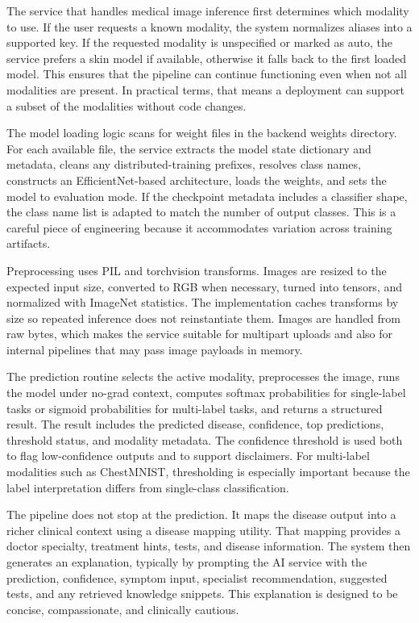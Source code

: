 \documentclass[conference]{IEEEtran}
\begin{document}
The service that handles medical image inference first determines which modality to use. If the user requests a known modality, the system normalizes aliases into a supported key. If the requested modality is unspecified or marked as auto, the service prefers a skin model if available, otherwise it falls back to the first loaded model. This ensures that the pipeline can continue functioning even when not all modalities are present. In practical terms, that means a deployment can support a subset of the modalities without code changes.

The model loading logic scans for weight files in the backend weights directory. For each available file, the service extracts the model state dictionary and metadata, cleans any distributed-training prefixes, resolves class names, constructs an EfficientNet-based architecture, loads the weights, and sets the model to evaluation mode. If the checkpoint metadata includes a classifier shape, the class name list is adapted to match the number of output classes. This is a careful piece of engineering because it accommodates variation across training artifacts.

Preprocessing uses PIL and torchvision transforms. Images are resized to the expected input size, converted to RGB when necessary, turned into tensors, and normalized with ImageNet statistics. The implementation caches transforms by size so repeated inference does not reinstantiate them. Images are handled from raw bytes, which makes the service suitable for multipart uploads and also for internal pipelines that may pass image payloads in memory.

The prediction routine selects the active modality, preprocesses the image, runs the model under no-grad context, computes softmax probabilities for single-label tasks or sigmoid probabilities for multi-label tasks, and returns a structured result. The result includes the predicted disease, confidence, top predictions, threshold status, and modality metadata. The confidence threshold is used both to flag low-confidence outputs and to support disclaimers. For multi-label modalities such as ChestMNIST, thresholding is especially important because the label interpretation differs from single-class classification.

The pipeline does not stop at the prediction. It maps the disease output into a richer clinical context using a disease mapping utility. That mapping provides a doctor specialty, treatment hints, tests, and disease information. The system then generates an explanation, typically by prompting the AI service with the prediction, confidence, symptom input, specialist recommendation, suggested tests, and any retrieved knowledge snippets. This explanation is designed to be concise, compassionate, and clinically cautious.
\end{document}
